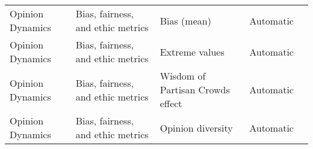 \begin{small}
\begin{center}
\begin{longtable}{@{}p{}p{}p{}p{}p{}@{}}
Opinion Dynamics         & Bias, fairness, and ethic metrics   & Bias (mean)                                                                                                                                                                                                 & Automatic & \cite{chuang2023simulating}                                                                                                                                                                                                                                                                                                                                                                                           \\
Opinion Dynamics         & Bias, fairness, and ethic metrics   & Extreme values                                                                                                                                                                                              & Automatic & \cite{Chuang2023TheWO}                                                                                                                                                                                                                                                                                                                                                                                        \\
Opinion Dynamics         & Bias, fairness, and ethic metrics   & Wisdom of Partisan Crowds effect                                                                                                                                                                            & Automatic & \cite{Chuang2023TheWO}                                                                                                                                                                                                                                                                                                                                                                                        \\
Opinion Dynamics         & Bias, fairness, and ethic metrics   & Opinion diversity                                                                                                                                                                                           & Automatic & \cite{chuang2023simulating}                                                                                                                                                                                                                                                                                                                                                                                           \\

\end{longtable}
\end{center}
\end{small}

